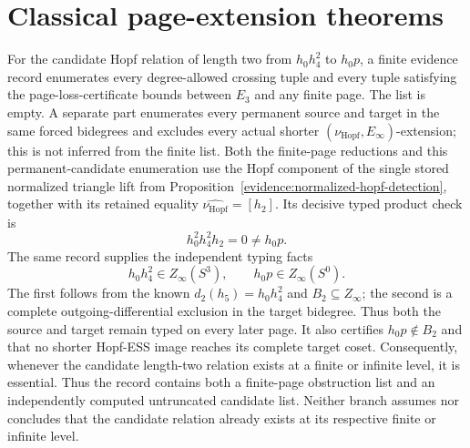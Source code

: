 \section{Classical page-extension theorems}

\begin{proposition}
  \label{evidence:hopf-crossing-obstruction-exclusion}
  \notready
  For the candidate Hopf relation of length two from
  $h_0h_4^2$ to $h_0p$, a finite evidence record enumerates every
  degree-allowed crossing tuple and every tuple satisfying the
  page-loss-certificate bounds between $E_3$ and any finite page.  The list is
  empty.  A separate part enumerates every permanent source and target in the
  same forced bidegrees and excludes every actual shorter
  $(\nu_{\mathrm{Hopf}},E_\infty)$-extension; this is not inferred from the
  finite list.  Both the finite-page reductions and this permanent-candidate
  enumeration use the Hopf component of the single stored normalized
  triangle lift from Proposition~\ref{evidence:normalized-hopf-detection},
  together with its retained equality
  $\widehat{\nu_{\mathrm{Hopf}}}=[h_2]$.  Its decisive typed product check is
  \[
    h_0^2h_4^2h_2=0\ne h_0p.
  \]
  The same record supplies the independent typing facts
  \[
    h_0h_4^2\in Z_\infty(S^3),
    \qquad h_0p\in Z_\infty(S^0).
  \]
  The first follows from the known $d_2(h_5)=h_0h_4^2$ and
  $B_2\subseteq Z_\infty$; the second is a complete outgoing-differential
  exclusion in the target bidegree.  Thus both the source and target remain
  typed on every later page.  It also certifies
  $h_0p\notin B_2$ and that no shorter Hopf-ESS image reaches its complete
  target coset.  Consequently, whenever the candidate length-two relation
  exists at a finite or infinite level, it is essential.
  Thus the record contains both a finite-page obstruction list and an
  independently computed untruncated candidate list.  Neither branch assumes
  nor concludes that the candidate relation already exists at its respective
  finite or infinite level.
\end{proposition}

